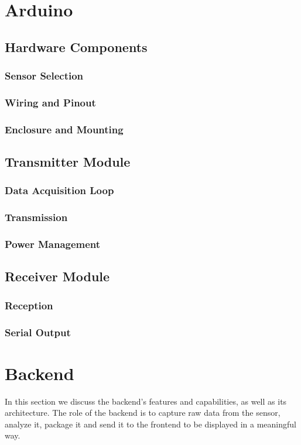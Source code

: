 \documentclass{article}
\begin{document}
\section{Arduino}
\subsection{Hardware Components}
    \subsubsection{Sensor Selection}
    \subsubsection{Wiring and Pinout}
    \subsubsection{Enclosure and Mounting}
\subsection{Transmitter Module}
    \subsubsection{Data Acquisition Loop}
    \subsubsection{Transmission}
    \subsubsection{Power Management}
\subsection{Receiver Module}
    \subsubsection{Reception}
    \subsubsection{Serial Output}

\section{Backend}
In this section we discuss the backend's features and capabilities, as well as its architecture. The role of the backend is to capture raw data from the sensor, analyze it, package it and send it to the frontend to be displayed in a meaningful way.
\end{document}
